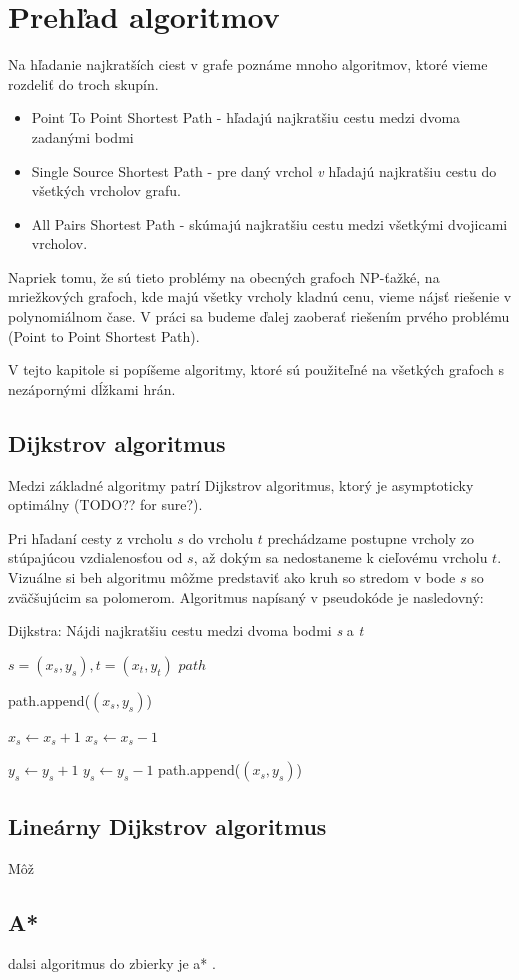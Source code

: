 \chapter{Prehľad algoritmov}
Na hľadanie najkratších ciest v grafe poznáme mnoho algoritmov, ktoré vieme rozdeliť do troch skupín.


\begin{itemize}
\item Point To Point Shortest Path - hľadajú najkratšiu cestu medzi dvoma zadanými bodmi
\item Single Source Shortest Path - pre daný vrchol {\sl v} hľadajú najkratšiu cestu do všetkých vrcholov grafu.
\item All Pairs Shortest Path - skúmajú najkratšiu cestu medzi všetkými dvojicami vrcholov.
\end{itemize}

Napriek tomu, že sú tieto problémy na obecných grafoch NP-ťažké, na mriežkových grafoch, kde majú všetky vrcholy kladnú cenu, vieme nájsť riešenie v polynomiálnom čase.
V práci sa budeme ďalej zaoberať riešením prvého problému (Point to Point Shortest Path).

V tejto kapitole si popíšeme algoritmy, ktoré sú použiteľné na všetkých grafoch 
s nezápornými dĺžkami hrán.

\section{Dijkstrov algoritmus}
Medzi základné algoritmy patrí Dijkstrov algoritmus, ktorý je asymptoticky optimálny (TODO?? for sure?).

Pri hľadaní cesty z vrcholu $s$ do vrcholu $t$ prechádzame postupne vrcholy zo stúpajúcou vzdialenosťou od $s$, až dokým sa nedostaneme k cieľovému vrcholu $t$.
Vizuálne si beh algoritmu môžme predstaviť ako kruh so stredom v bode $s$ so zväčšujúcim sa polomerom. Algoritmus napísaný v pseudokóde je nasledovný:


\begin{algorithm}
\caption{Dijkstra: Nájdi najkratšiu cestu medzi dvoma bodmi {\sl s} a {\sl t}}
\label{alg:dijkstra}
\begin{algorithmic}[1] %
\REQUIRE $s=(x_s,y_s), t=(x_t,y_t)$
\ENSURE $path$


\STATE path.append($(x_s, y_s)$)

		\STATE $x_s \leftarrow x_s + 1$
		\STATE $x_s \leftarrow x_s - 1$
	\ENDIF

		\STATE $y_s \leftarrow y_s + 1$
		\STATE $y_s \leftarrow y_s - 1$
	\ENDIF
	\STATE path.append($(x_s, y_s)$)
\ENDWHILE

\end{algorithmic}
\end{algorithm}



\section{Lineárny Dijkstrov algoritmus}
Môž


\section{A*}
dalsi algoritmus do zbierky je a* \cite{astar72}.
